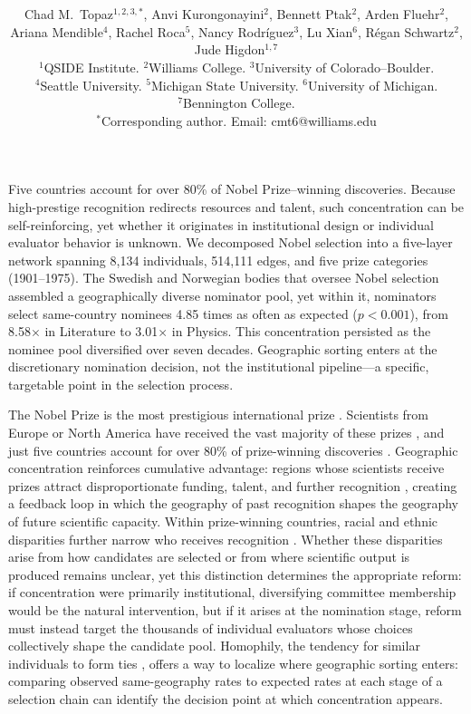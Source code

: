 \documentclass[12pt]{article}
\date{}
\title{\bfseries \boldmath \scititle}
\author{%
Chad M.\ Topaz$^{1,2,3,\ast}$,
Anvi Kurongonayini$^{2}$,
Bennett Ptak$^{2}$,
Arden Fluehr$^{2}$,\\
Ariana Mendible$^{4}$,
Rachel Roca$^{5}$,
Nancy Rodr\'{i}guez$^{3}$,
Lu Xian$^{6}$,
R\'{e}gan Schwartz$^{2}$,\\
Jude Higdon$^{1,7}$\\[10pt]
\normalsize $^{1}$QSIDE Institute.
$^{2}$Williams College.
$^{3}$University of Colorado--Boulder.\\
\normalsize $^{4}$Seattle University.
$^{5}$Michigan State University.
$^{6}$University of Michigan.\\
\normalsize $^{7}$Bennington College.\\[4pt]
\small $^\ast$Corresponding author. Email: cmt6@williams.edu
}
\renewenvironment{abstract}
	{\quotation}
	{\endquotation}
\begin{document}
\maketitle

\begin{abstract}
Five countries account for over 80\% of Nobel Prize--winning discoveries. Because high-prestige recognition redirects resources and talent, such concentration can be self-reinforcing, yet whether it originates in institutional design or individual evaluator behavior is unknown. We decomposed Nobel selection into a five-layer network spanning 8,134 individuals, 514,111 edges, and five prize categories (1901--1975). The Swedish and Norwegian bodies that oversee Nobel selection assembled a geographically diverse nominator pool, yet within it, nominators select same-country nominees 4.85 times as often as expected ($p < 0.001$), from 8.58$\times$ in Literature to 3.01$\times$ in Physics. This concentration persisted as the nominee pool diversified over seven decades. Geographic sorting enters at the discretionary nomination decision, not the institutional pipeline---a specific, targetable point in the selection process.
\end{abstract}

\noindent The Nobel Prize is the most prestigious international prize \cite{CasFan2013}. Scientists from Europe or North America have received the vast majority of these prizes \cite{LunJenJau2019, ChaEllRah2011, Cra2001}, and just five countries account for over 80\% of prize-winning discoveries \cite{vonZed2025}. Geographic concentration reinforces cumulative advantage: regions whose scientists receive prizes attract disproportionate funding, talent, and further recognition \cite{Mer1968, Zuc1977, ColCol1973, Gar1972}, creating a feedback loop in which the geography of past recognition shapes the geography of future scientific capacity. Within prize-winning countries, racial and ethnic disparities further narrow who receives recognition \cite{NeiVueVue2024}. Whether these disparities arise from how candidates are selected or from where scientific output is produced remains unclear, yet this distinction determines the appropriate reform: if concentration were primarily institutional, diversifying committee membership would be the natural intervention, but if it arises at the nomination stage, reform must instead target the thousands of individual evaluators whose choices collectively shape the candidate pool. Homophily, the tendency for similar individuals to form ties \cite{McPSmoCoo2001}, offers a way to localize where geographic sorting enters: comparing observed same-geography rates to expected rates at each stage of a selection chain can identify the decision point at which concentration appears.
\end{document}
